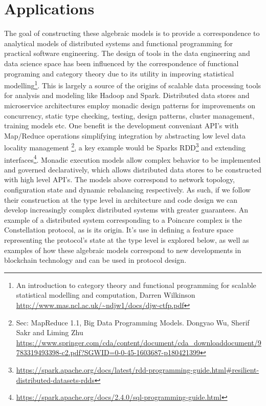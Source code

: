 \documentclass{article}
\begin{document}
\section{Applications} 
The goal of constructing these algebraic models is to provide a correspondence to analytical models of distributed systems and functional programming for practical software engineering. The design of tools in the data engineering and data science space has been influenced by the correspondence of functional programing and category theory due to its utility in improving statistical modelling\footnote{An introduction to category theory and functional programming for scalable statistical modelling and computation, Darren Wilkinson \url{http://www.mas.ncl.ac.uk/~ndjw1/docs/djw-ctfp.pdf}}. This is largely a source of the origins of scalable data processing tools for analysis and modeling like Hadoop and Spark. Distributed data stores and microservice architectures employ monadic design patterns for improvements on concurrency, static type checking, testing, design patterns, cluster management, training models etc. One benefit is the development conveniant API's with Map/Reduce operations simplifying integration by abstracting low level data locality management \footnote{Sec: MapReduce 1.1, Big Data Programming Models. Dongyao Wu, Sherif Sakr and Liming Zhu \url{https://www.springer.com/cda/content/document/cda_downloaddocument/9783319493398-c2.pdf?SGWID=0-0-45-1603687-p180421399}}, a key example would be Sparks RDD\footnote{\url{https://spark.apache.org/docs/latest/rdd-programming-guide.html#resilient-distributed-datasets-rdds}} and extending interfaces\footnote{\url{https://spark.apache.org/docs/2.4.0/sql-programming-guide.html}}. Monadic execution models allow complex behavior to be implemented and governed declaratively, which allows distributed data stores to be constructed with high level API's. The models above correspond to network topology, configuration state and dynamic rebalancing respectively. As such, if we follow their construction at the type level in architecture and code design we can develop increasingly complex distributed systems with greater guarantees. An example of a distributed system corresponding to a Poincare complex is the Constellation protocol, as is its origin. It's use in defining a feature space representing the protocol's state at the type level is explored below, as well as examples of how these algebraic models correspond to new developments in blockchain technology and can be used in protocol design.
\end{document}
